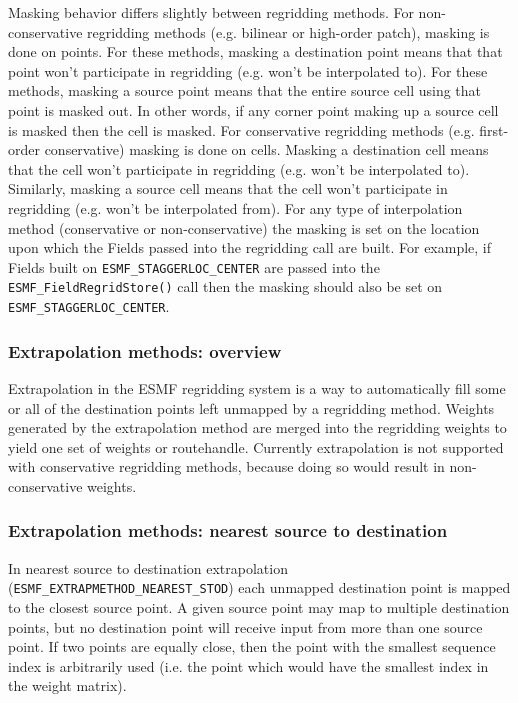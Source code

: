Masking behavior differs slightly between regridding methods. For
non-conservative regridding methods (e.g. bilinear or high-order
patch), masking is done on points. For these methods, masking a
destination point means that that point won't participate in
regridding (e.g. won't be interpolated to). For these methods,
masking a source point means that the entire source cell using
that point is masked out. In other words, if any corner point
making up a source cell is masked then the cell is masked. For
conservative regridding methods (e.g. first-order conservative)
masking is done on cells. Masking a destination cell means that
the cell won't participate in regridding (e.g. won't be
interpolated to). Similarly, masking a source cell means that the
cell won't participate in regridding (e.g. won't be interpolated
from).  For any type of interpolation method (conservative or
non-conservative) the masking is set on the location upon
which the Fields passed into the regridding call are built.
For example, if Fields built on  {\tt ESMF\_STAGGERLOC\_CENTER} are
passed into the {\tt ESMF\_FieldRegridStore()} call then the masking
should also be set on {\tt ESMF\_STAGGERLOC\_CENTER}.

\subsubsection{Extrapolation methods: overview}\label{sec:extrapolation:overview}

Extrapolation in the ESMF regridding system is a way to automatically fill some or all of the 
destination points left unmapped by a regridding method. Weights generated by
the extrapolation method are merged into the regridding weights to yield one set of weights or 
routehandle. Currently extrapolation is not supported with conservative regridding methods, because 
doing so would result in non-conservative weights. 

\subsubsection{Extrapolation methods: nearest source to destination}\label{sec:extrapolation:neareststod}
In nearest source to destination extrapolation ({\tt ESMF\_EXTRAPMETHOD\_NEAREST\_STOD}) each unmapped 
destination point is mapped to the closest source point. A given source point may map to 
multiple destination points, but no destination point will receive input from more than one source point. 
If two points are equally close, then the point with the smallest sequence index is arbitrarily used 
(i.e. the point which would have the smallest index in the weight matrix). 

